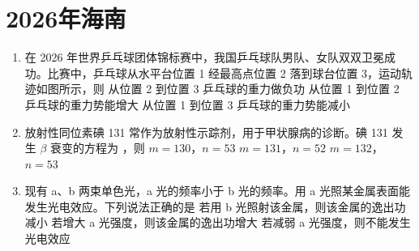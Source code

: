 \documentclass[\gkver]{gaokaozhenti}
\begin{document}
\chapter{2026年海南}

\begin{enumerate}
\item
在 2026 年世界乒乓球团体锦标赛中，我国乒乓球队男队、女队双双卫冕成功。比赛中，乒乓球从水平台位置 1 经最高点位置 2 落到球台位置 3，运动轨迹如图所示，则
{从位置 2 到位置 3 乒乓球的重力做负功}
{从位置 1 到位置 2 乒乓球的重力势能增大}
{从位置 1 到位置 3 乒乓球的重力势能减小}


\item
放射性同位素碘 131 常作为放射性示踪剂，用于甲状腺病的诊断。碘 131 发生 $\beta$ 衰变的方程为 ，则
{$m = 130$，$n = 53$}
{$m = 131$，$n = 52$}
{$m = 132$，$n = 53$}


\item
现有 a、b 两束单色光，a 光的频率小于 b 光的频率。用 a 光照某金属表面能发生光电效应。下列说法正确的是
{若用 b 光照射该金属，则该金属的逸出功减小}
{若增大 a 光强度，则该金属的逸出功增大}
{若减弱 a 光强度，则不能发生光电效应}


\end{enumerate}
\end{document}
